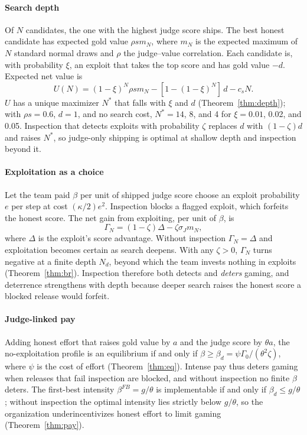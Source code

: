 \documentclass[acmsmall,screen,review,anonymous]{acmart}
\theoremstyle{acmdefinition}
\begin{document}
\paragraph{Search depth} Of $N$ candidates, the one with the highest judge score ships. The best honest candidate has expected gold value $\rho s m_N$, where $m_N$ is the expected maximum of $N$ standard normal draws and $\rho$ the judge--value correlation. Each candidate is, with probability $\xi$, an exploit that takes the top score and has gold value $-d$. Expected net value is
\begin{equation}\label{eq:depth}
U(N) = (1-\xi)^N \rho s m_N - [1-(1-\xi)^N]\,d - c_s N .
\end{equation}
$U$ has a unique maximizer $N^*$ that falls with $\xi$ and $d$ (Theorem~\ref{thm:depth}); with $\rho s = 0.6$, $d = 1$, and no search cost, $N^* = 14$, 8, and 4 for $\xi = 0.01$, 0.02, and 0.05. Inspection that detects exploits with probability $\zeta$ replaces $d$ with $(1-\zeta)d$ and raises $N^*$, so judge-only shipping is optimal at shallow depth and inspection beyond it.

\paragraph{Exploitation as a choice} Let the team paid $\beta$ per unit of shipped judge score choose an exploit probability $e$ per step at cost $(\kappa/2)e^2$. Inspection blocks a flagged exploit, which forfeits the honest score. The net gain from exploiting, per unit of $\beta$, is
\begin{equation}\label{eq:gamma}
\Gamma_N = (1-\zeta)\Delta - \zeta\sigma_J m_N ,
\end{equation}
where $\Delta$ is the exploit's score advantage. Without inspection $\Gamma_N = \Delta$ and exploitation becomes certain as search deepens. With any $\zeta > 0$, $\Gamma_N$ turns negative at a finite depth $N_d$, beyond which the team invests nothing in exploits (Theorem~\ref{thm:br}). Inspection therefore both detects and \emph{deters} gaming, and deterrence strengthens with depth because deeper search raises the honest score a blocked release would forfeit.

\paragraph{Judge-linked pay} Adding honest effort that raises gold value by $a$ and the judge score by $\theta a$, the no-exploitation profile is an equilibrium if and only if $\beta \ge \beta_d = \psi\Gamma_0/(\theta^2\zeta)$, where $\psi$ is the cost of effort (Theorem~\ref{thm:eq}). Intense pay thus deters gaming when releases that fail inspection are blocked, and without inspection no finite $\beta$ deters. The first-best intensity $\beta^{FB} = g/\theta$ is implementable if and only if $\beta_d \le g/\theta$; without inspection the optimal intensity lies strictly below $g/\theta$, so the organization underincentivizes honest effort to limit gaming (Theorem~\ref{thm:pay}).
\end{document}
